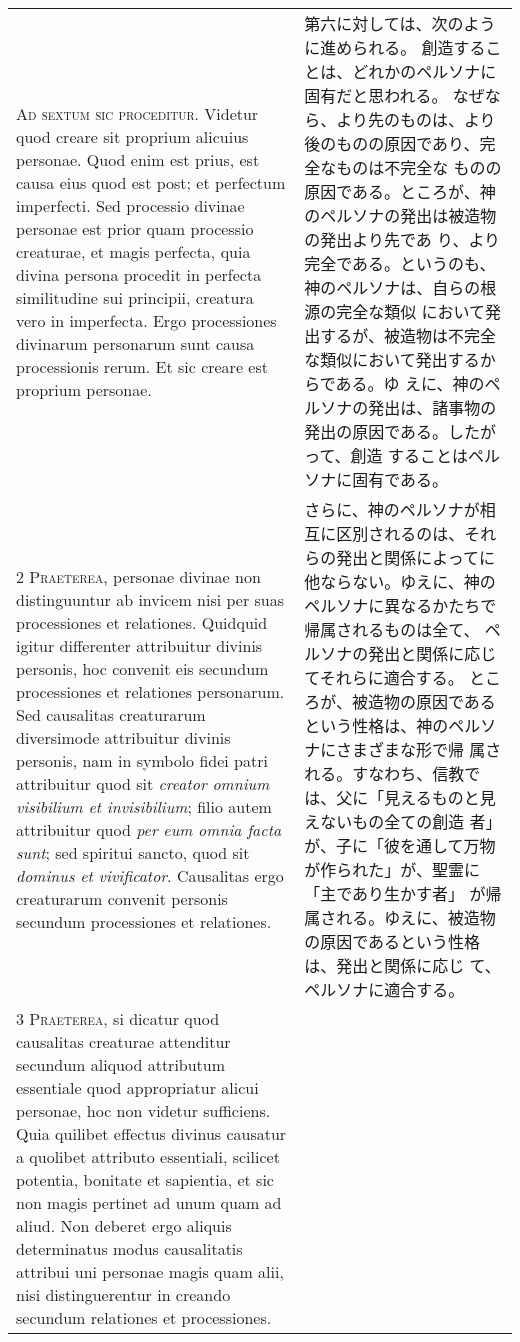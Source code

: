 \documentclass[10pt]{jsarticle} %
\begin{document}
\begin{longtable}{p{21em}p{21em}}
{\huge A}{\scshape d sextum sic proceditur}. Videtur quod
creare sit proprium alicuius personae. Quod enim est prius, est causa
eius quod est post; et perfectum imperfecti. Sed processio divinae
personae est prior quam processio creaturae, et magis perfecta, quia
divina persona procedit in perfecta similitudine sui principii, creatura
vero in imperfecta. Ergo processiones divinarum personarum sunt causa
processionis rerum. Et sic creare est proprium personae.

&

第六に対しては、次のように進められる。
創造することは、どれかのペルソナに固有だと思われる。
なぜなら、より先のものは、より後のものの原因であり、完全なものは不完全な
 ものの原因である。ところが、神のペルソナの発出は被造物の発出より先であ
 り、より完全である。というのも、神のペルソナは、自らの根源の完全な類似
 において発出するが、被造物は不完全な類似において発出するからである。ゆ
 えに、神のペルソナの発出は、諸事物の発出の原因である。したがって、創造
 することはペルソナに固有である。

\\


{\scshape 2 Praeterea}, personae divinae non distinguuntur ab invicem
nisi per suas processiones et relationes. Quidquid igitur differenter
attribuitur divinis personis, hoc convenit eis secundum processiones et
relationes personarum. Sed causalitas creaturarum diversimode
attribuitur divinis personis, nam in symbolo fidei patri attribuitur
quod sit {\itshape creator omnium visibilium et invisibilium}; filio
autem attribuitur quod {\itshape per eum omnia facta sunt}; sed spiritui
sancto, quod sit {\itshape dominus et vivificator}. Causalitas ergo
creaturarum convenit personis secundum processiones et relationes.

&

さらに、神のペルソナが相互に区別されるのは、それらの発出と関係によってに
 他ならない。ゆえに、神のペルソナに異なるかたちで帰属されるものは全て、
 ペルソナの発出と関係に応じてそれらに適合する。
ところが、被造物の原因であるという性格は、神のペルソナにさまざまな形で帰
 属される。すなわち、信教では、父に「見えるものと見えないもの全ての創造
 者」が、子に「彼を通して万物が作られた」が、聖霊に「主であり生かす者」
 が帰属される。ゆえに、被造物の原因であるという性格は、発出と関係に応じ
 て、ペルソナに適合する。

\\

{\scshape 3 Praeterea}, si dicatur quod causalitas
creaturae attenditur secundum aliquod attributum essentiale quod
appropriatur alicui personae, hoc non videtur sufficiens. Quia quilibet
effectus divinus causatur a quolibet attributo essentiali, scilicet
potentia, bonitate et sapientia, et sic non magis pertinet ad unum quam
ad aliud. Non deberet ergo aliquis determinatus modus causalitatis
attribui uni personae magis quam alii, nisi distinguerentur in creando
secundum relationes et processiones.


\end{longtable}
\end{document}
